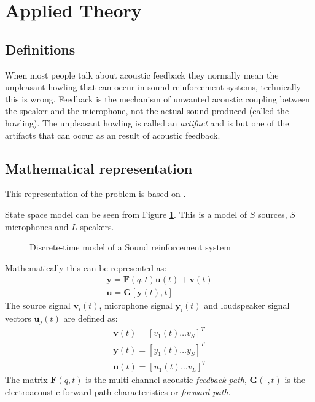 \section{Applied Theory}
\subsection{Definitions}
When most people talk about acoustic feedback they normally mean the unpleasant howling that can occur in sound reinforcement systems, technically this is wrong. Feedback is the mechanism of unwanted acoustic coupling between the speaker and the microphone, not the actual sound produced (called the howling). The unpleasant howling is called an \textit{artifact} and is but one of the artifacts that can occur as an result of acoustic feedback.

\subsection{Mathematical representation}
This representation of the problem is based on \cite{van_waterschoot_fifty_2011}. 

State space model can be seen from Figure \ref{feedmodel}. This is a model of $S$ sources, $S$ microphones and $L$ speakers.
\begin{figure}[H]
    \begin{center}
        
    \end{center}
    \caption{Discrete-time model of a Sound reinforcement system}
    \label{feedmodel}
\end{figure} 
Mathematically this can be represented as:
\begin{eqnarray}
\mathbf{y}= \mathbf{F}(q,t)\mathbf{u}(t) + \mathbf{v}(t)\\
\mathbf{u} = \mathbf{G}[\mathbf{y}(t),t]
\end{eqnarray}
The source signal $\mathbf{v}_i(t)$, microphone signal $\mathbf{y}_i(t)$ and loudspeaker signal vectors $\mathbf{u}_j(t)$ are defined as: 
\begin{eqnarray}
\mathbf{v}(t) = [v_1(t) \ldots v_S]^T \\
\mathbf{y}(t) = [y_1(t) \ldots y_S]^T \\
\mathbf{u}(t) = [u_1(t) \ldots v_L]^T
\end{eqnarray}
The matrix $\mathbf{F}(q,t)$ is the multi channel acoustic \textit{feedback path}, $\mathbf{G}(\cdot,t)$ is the electroacoustic forward path characteristics or \textit{forward path}.

